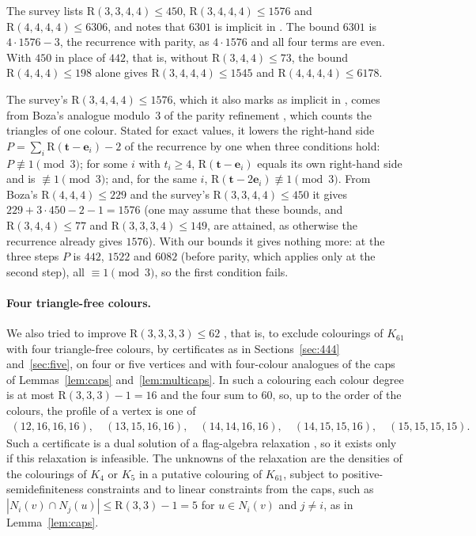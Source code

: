\documentclass[11pt]{article}
\theoremstyle{spacedplain}
\theoremstyle{spaceddef}
\theoremstyle{spacedremark}
\newcommand{\R}{\mathrm{R}}
\newcommand{\bt}{\mathbf{t}}
\newcommand{\e}{\mathbf{e}}
\providecommand{\mkbreak}[1]{#1}%
\begin{document}
The survey lists $\R(3,3,4,4)\le 450$, $\R(3,4,4,4)\le 1576$ and $\R(4,4,4,4)\le 6306$, and notes that $6301$ is implicit in \cite{Boz26}.
The bound $6301$ is $4\cdot 1576-3$, the recurrence with parity, as $4\cdot 1576$ and all four terms are even.
With $450$ in place of $442$, that is, without $\R(3,4,4)\le 73$, the bound $\R(4,4,4)\le 198$ alone gives $\R(3,4,4,4)\le 1545$ and $\R(4,4,4,4)\le 6178$.

The survey's $\R(3,4,4,4)\le 1576$, which it also marks as implicit in \cite{Boz26}, comes from Boza's analogue modulo~$3$ of the parity refinement \cite[Theorem~2.1]{Boz26}, which counts the triangles of one colour.
Stated for exact values, it lowers the right-hand side $P=\sum_i\R(\bt-\e_i)-2$ of the recurrence by one when three conditions hold: $P\not\equiv 1\pmod 3$; for some $i$ with $t_i\ge 4$, $\R(\bt-\e_i)$ equals its own right-hand side and is $\not\equiv 1\pmod 3$; and, for the same $i$, $\R(\bt-2\e_i)\not\equiv 1\pmod 3$.
From Boza's $\R(4,4,4)\le 229$ and the survey's $\R(3,3,4,4)\le 450$ it gives $229+3\cdot 450-2-1=1576$ (one may assume that these bounds, and $\R(3,4,4)\le 77$ and $\R(3,3,3,4)\le 149$, are attained, as otherwise the recurrence already gives $1576$).
With our bounds it gives nothing more: at the three steps $P$ is $442$, $1522$ and $6082$ (before parity, which applies only at the second step), all $\equiv 1\pmod 3$, so the first condition fails.

\paragraph{Four triangle-free colours.}
We also tried to improve $\R(3,3,3,3)\le 62$ \cite{FKR04}, that is, to exclude colourings of $K_{61}$ with four triangle-free colours, by certificates as in Sections~\ref{sec:444} and~\ref{sec:five}, on four or five vertices and with four-colour analogues of the caps of Lemmas~\ref{lem:caps} and~\ref{lem:multicaps}.
In such a colouring each colour degree is at most $\R(3,3,3)-1=16$ \cite{GG55} and the four sum to $60$, so, up to the order of the colours, the profile of a vertex is one of
\[
\begin{gathered}
(12,16,16,16),\quad (13,15,16,16),\quad (14,14,16,16),\mkbreak{\quad} (14,15,15,16),\quad (15,15,15,15).
\end{gathered}
\]
Such a certificate is a dual solution of a flag-algebra relaxation \cite{Raz07}, so it exists only if this relaxation is infeasible.
The unknowns of the relaxation are the densities of the colourings of $K_4$ or $K_5$ in a putative colouring of $K_{61}$, subject to positive-semidefiniteness constraints and to linear constraints from the caps, such as $|N_i(v)\cap N_j(u)|\le\R(3,3)-1=5$ for $u\in N_i(v)$ and $j\ne i$, as in Lemma~\ref{lem:caps}.
\end{document}
